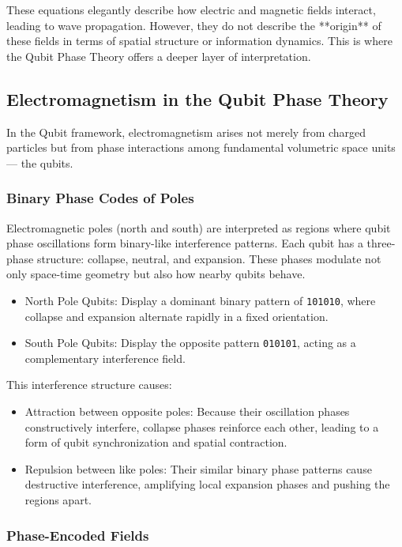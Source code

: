 \documentclass[12pt]{report} %
\begin{document}
These equations elegantly describe how electric and magnetic fields interact, leading to wave propagation. However, they do not describe the **origin** of these fields in terms of spatial structure or information dynamics. This is where the Qubit Phase Theory offers a deeper layer of interpretation.

\subsection*{Electromagnetism in the Qubit Phase Theory}

In the Qubit framework, electromagnetism arises not merely from charged particles but from phase interactions among fundamental volumetric space units — the qubits.

\subsubsection*{Binary Phase Codes of Poles}

Electromagnetic poles (north and south) are interpreted as regions where qubit phase oscillations form binary-like interference patterns. Each qubit has a three-phase structure: collapse, neutral, and expansion. These phases modulate not only space-time geometry but also how nearby qubits behave.

\begin{itemize}
  \item North Pole Qubits: Display a dominant binary pattern of \texttt{101010}, where collapse and expansion alternate rapidly in a fixed orientation.
  \item South Pole Qubits: Display the opposite pattern \texttt{010101}, acting as a complementary interference field.
\end{itemize}

This interference structure causes:

\begin{itemize}
  \item Attraction between opposite poles: Because their oscillation phases constructively interfere, collapse phases reinforce each other, leading to a form of qubit synchronization and spatial contraction.
  \item Repulsion between like poles: Their similar binary phase patterns cause destructive interference, amplifying local expansion phases and pushing the regions apart.
\end{itemize}

\subsubsection*{Phase-Encoded Fields}
\end{document}
